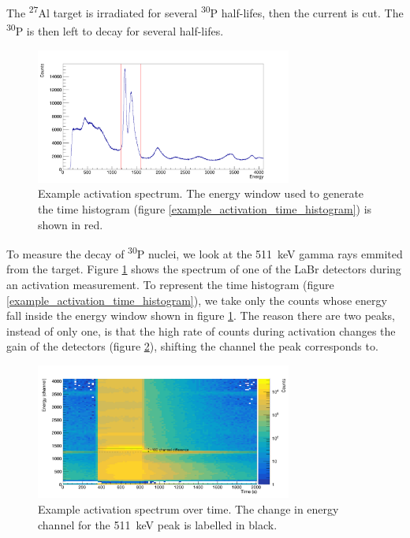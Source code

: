 \documentclass[a4paper,12pt]{report}
\newcommand{\Aliso}{\textsuperscript{27}Al }
\newcommand{\Piso}{\textsuperscript{30}P }
\begin{document}
The \Aliso target is irradiated for several \Piso half-lifes, then the current is cut.
The \Piso is then left to decay for several half-lifes.

\begin{figure}[H]
	\centering
	\includegraphics[width=0.75\textwidth]{example_activation_energy_histogram.png}
	\caption{Example activation spectrum.
	The energy window used to generate the time histogram (figure \ref{example_activation_time_histogram}) is shown in red.}
	\label{example_activation_energy_histogram}
\end{figure}

To measure the decay of \Piso nuclei, we look at the \qty{511}{\keV} gamma rays emmited from the target.
Figure \ref{example_activation_energy_histogram} shows the spectrum of one of the LaBr detectors during an activation measurement.
To represent the time histogram (figure \ref{example_activation_time_histogram}), we take only the counts whose energy fall inside the energy window shown in figure \ref{example_activation_energy_histogram}.
The reason there are two peaks, instead of only one, is that the high rate of counts during activation changes the gain of the detectors (figure \ref{example_activation_energytime}), shifting the channel the peak corresponds to.

\begin{figure}[H]
	\centering
	\includegraphics[width=0.75\textwidth]{example_activation_energytime.png}
	\caption{Example activation spectrum over time.
	The change in energy channel for the \qty{511}{\keV} peak is labelled in black.}
	\label{example_activation_energytime}
\end{figure}
\end{document}
